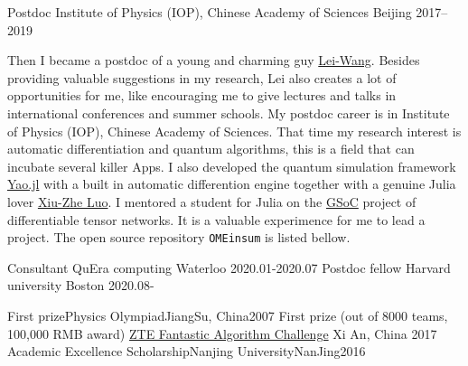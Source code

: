 \documentclass[11pt, a4paper]{awesome-cv}
\begin{document}
\begin{cvskills}
\end{cvskills}
\begin{cventries}
  \cventry
    {Postdoc}
    {Institute of Physics (IOP), Chinese Academy of Sciences}
    {Beijing}
    {2017--2019}
    {\begin{cvitems}
        Then I became a postdoc of a young and charming guy \href{http://wangleiphy.github.io/}{Lei-Wang}. Besides providing valuable suggestions in my research, Lei also creates a lot of opportunities for me, like encouraging me to give lectures and talks in international conferences and summer schools.
        My postdoc career is in Institute of Physics (IOP), Chinese Academy of Sciences. That time my research interest is automatic differentiation and quantum algorithms, this is a field that can incubate several killer Apps. I also developed the quantum simulation framework \href{https://github.com/QuantumBFS/Yao.jl}{Yao.jl} with a built in automatic differention engine together with a genuine Julia lover \href{http://blog.rogerluo.me/}{Xiu-Zhe Luo}.
        I mentored a student for Julia on the \href{https://summerofcode.withgoogle.com/}{GSoC} project of differentiable tensor networks. It is a valuable experimence for me to lead a project. The open source repository \texttt{OMEinsum} is listed bellow.
    \end{cvitems}}
  \cventry
    {Consultant}
    {QuEra computing}
    {Waterloo}
    {2020.01-2020.07}  %
    {}
  \cventry
    {Postdoc fellow}
    {Harvard university}
    {Boston}
    {2020.08-}  %
    {}
\end{cventries}
%
\begin{cvhonors}
    \cvhonor
    {First prize}{Physics Olympiad}{JiangSu, China}{2007}
    \cvhonor
    {First prize (out of 8000 teams, 100,000 RMB award)} %
    {\href{http://www.iqiyi.com/w\_19rto3v4h1.html}{ZTE Fantastic Algorithm Challenge}} %
    {Xi An, China} %
    {2017} %
    \cvhonor
    {Academic Excellence Scholarship}{Nanjing University}{NanJing}{2016}
\end{cvhonors}
\end{document}
